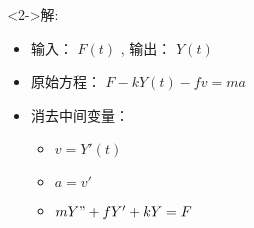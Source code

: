 \documentclass{beamer}
\begin{document}
\begin{frame}
\begin{columns}
\begin{column}{0.5\textwidth}
\begin{block}
\end{block}
\end{column}
\begin{column}{0.5\textwidth}
\begin{block}<2->{解:}
\label{sec-3-1-2}


\begin{itemize}
\item 输入： $F(t)$ , 输出： $Y(t)$
\item 原始方程： $F- k Y(t) -f v = ma$
\item 消去中间变量：
\begin{itemize}
\item $v = Y'(t)$
\item $a = v'$
\item $mY"+fY'+kY=F$
\end{itemize}
\end{itemize}
\end{block}
\end{column}
\end{columns}
\end{frame}
\end{document}

